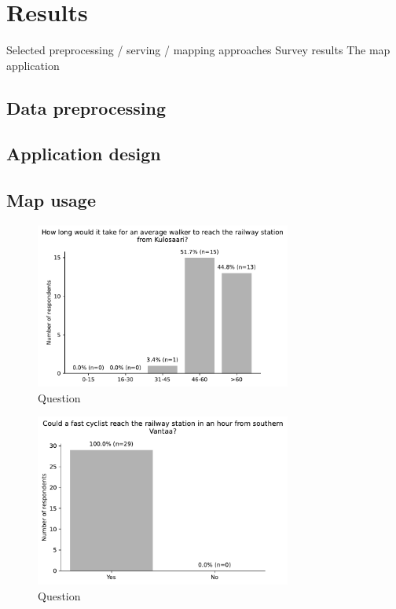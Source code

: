 \section{Results}
Selected preprocessing / serving / mapping approaches
Survey results
The map application

\subsection{Data preprocessing}

\subsection{Application design}

\subsection{Map usage}

\begin{figure}[H]
	\centering
	\includegraphics[width=0.75\textwidth]{images/questionnaire/0.pdf}
	\caption{Question}
	\label{fig:architechture}
\end{figure}

\begin{figure}[H]
	\centering
	\includegraphics[width=0.75\textwidth]{images/questionnaire/1.pdf}
	\caption{Question}
	\label{fig:architechture}
\end{figure}

